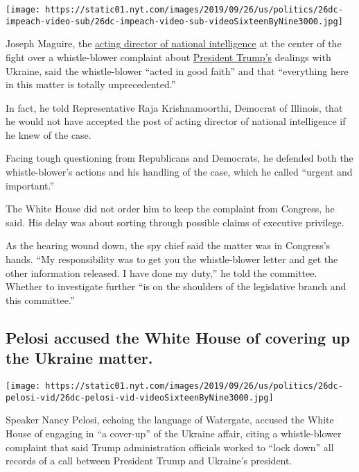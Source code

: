 \texttt{[image: https://static01.nyt.com/images/2019/09/26/us/politics/26dc-impeach-video-sub/26dc-impeach-video-sub-videoSixteenByNine3000.jpg]}

Joseph Maguire, the
\href{https://www.nytimes.com/2019/09/26/us/politics/joseph-maguire-intelligence.html}{acting
director of national intelligence} at the center of the fight over a
whistle-blower complaint about
\href{https://www.nytimes.com/interactive/2019/11/20/us/politics/trump-impeachment-hearings.html}{President
Trump's} dealings with Ukraine, said the whistle-blower ``acted in good
faith'' and that ``everything here in this matter is totally
unprecedented.''

In fact, he told Representative Raja Krishnamoorthi, Democrat of
Illinois, that he would not have accepted the post of acting director of
national intelligence if he knew of the case.

Facing tough questioning from Republicans and Democrats, he defended
both the whistle-blower's actions and his handling of the case, which he
called ``urgent and important.''

The White House did not order him to keep the complaint from Congress,
he said. His delay was about sorting through possible claims of
executive privilege.

As the hearing wound down, the spy chief said the matter was in
Congress's hands. ``My responsibility was to get you the whistle-blower
letter and get the other information released. I have done my duty,'' he
told the committee. Whether to investigate further ``is on the shoulders
of the legislative branch and this committee.''

\hypertarget{pelosi-accused-the-white-house-of-covering-up-the-ukraine-matter}{%
\subsection{Pelosi accused the White House of covering up the Ukraine
matter.}\label{pelosi-accused-the-white-house-of-covering-up-the-ukraine-matter}}

\texttt{[image: https://static01.nyt.com/images/2019/09/26/us/politics/26dc-pelosi-vid/26dc-pelosi-vid-videoSixteenByNine3000.jpg]}

Speaker Nancy Pelosi, echoing the language of Watergate, accused the
White House of engaging in ``a cover-up'' of the Ukraine affair, citing
a whistle-blower complaint that said Trump administration officials
worked to ``lock down'' all records of a call between President Trump
and Ukraine's president.

